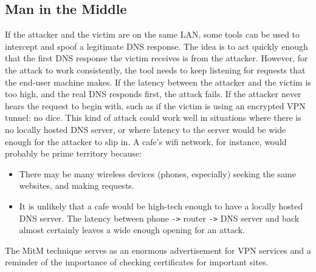 \documentclass{article}
\begin{document}
\subsection{Man in the Middle}
	If the attacker and the victim are on the same LAN, some tools can be
	used to intercept and spoof a legitimate DNS response. The idea is to
	act quickly enough that the first DNS response the victim receives is
	from the attacker.  However, for the attack to work consistently, the
	tool needs to keep listening for requests that the end-user machine
	makes. If the latency between the attacker and the victim is too high,
	and the real DNS responds first, the attack fails. If the attacker
	never hears the request to begin with, such as if the victim is using
	an encrypted VPN tunnel: no dice. This kind of attack could work well
	in situations where there is no locally hosted DNS server, or where
	latency to the server would be wide enough for the attacker to slip in.
	A cafe's wifi network, for instance, would probably be prime territory
	because:
\begin{itemize}
	\item There may be many wireless devices (phones, especially) seeking
		the same websites, and making requests.
	\item It is unlikely that a cafe would be high-tech enough to have a
		locally hosted DNS server. The latency between phone \verb'->'
		router \verb'->' DNS server and back almost certainly leaves a
		wide enough opening for an attack.
\end{itemize}

	The MitM technique serves as an enormous advertisement for VPN services
	and a reminder of the importance of checking certificates for important
	sites.
\end{document}
